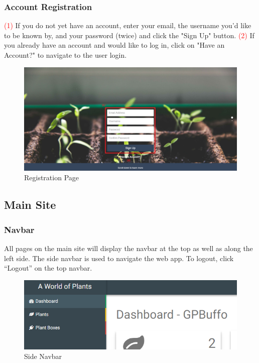 \documentclass{article}
\begin{document}
	\subsubsection{Account Registration}
		\textcolor{red}{(1)} If you do not yet have an account, enter your email, the username you'd like to be known by, and your password (twice) and click the "Sign Up" button.
		\newline
		\textcolor{red}{(2)} If you already have an account and would like to log in, click on "Have an Account?" to navigate to the user login.
		\newline
		\begin{figure}[H]
			\includegraphics[width=\textwidth]{../images/UserManual/registration.PNG}
			\caption{Registration Page}
		\end{figure}
		
\subsection{Main Site}
	\subsubsection{Navbar}
	All pages on the main site will display the navbar at the top as well as along the left side. The side navbar is used to navigate the web app. To logout, click ``Logout'' on the top navbar.
	
	\begin{figure}[H]
		\includegraphics[width=\textwidth]{../images/UserManual/side-navbar.png}
		\caption{Side Navbar}
	\end{figure}	
\end{document}
